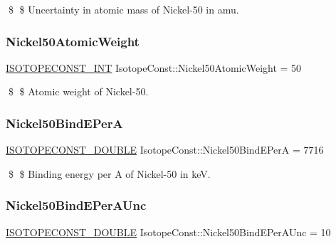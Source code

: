 \$ \$ Uncertainty in atomic mass of Nickel-\/50 in amu. \mbox{\label{group___isotope_const-_nickel-_ni50_gaa5640cea20bf6835bd30b4554a0245e8}} 
\subsubsection{\texorpdfstring{Nickel50\+Atomic\+Weight}{Nickel50AtomicWeight}}
{\footnotesize\ttfamily \mbox{\hyperlink{group___isotope_const-_macros_ga5f18360b3e99483a35c32d789e62621c}{I\+S\+O\+T\+O\+P\+E\+C\+O\+N\+S\+T\+\_\+\+I\+NT}} Isotope\+Const\+::\+Nickel50\+Atomic\+Weight = 50}

\$ \$ Atomic weight of Nickel-\/50. \mbox{\label{group___isotope_const-_nickel-_ni50_ga21435ec78c1c963f52e87ea57430b90c}} 
\subsubsection{\texorpdfstring{Nickel50\+Bind\+E\+PerA}{Nickel50BindEPerA}}
{\footnotesize\ttfamily \mbox{\hyperlink{group___isotope_const-_macros_ga8f45a7272ce02c0b4c65c44636ed719a}{I\+S\+O\+T\+O\+P\+E\+C\+O\+N\+S\+T\+\_\+\+D\+O\+U\+B\+LE}} Isotope\+Const\+::\+Nickel50\+Bind\+E\+PerA = 7716}

\$ \$ Binding energy per A of Nickel-\/50 in keV. \mbox{\label{group___isotope_const-_nickel-_ni50_ga7a7a5580cedc0d0b161a84afa5bb164c}} 
\subsubsection{\texorpdfstring{Nickel50\+Bind\+E\+Per\+A\+Unc}{Nickel50BindEPerAUnc}}
{\footnotesize\ttfamily \mbox{\hyperlink{group___isotope_const-_macros_ga8f45a7272ce02c0b4c65c44636ed719a}{I\+S\+O\+T\+O\+P\+E\+C\+O\+N\+S\+T\+\_\+\+D\+O\+U\+B\+LE}} Isotope\+Const\+::\+Nickel50\+Bind\+E\+Per\+A\+Unc = 10}


